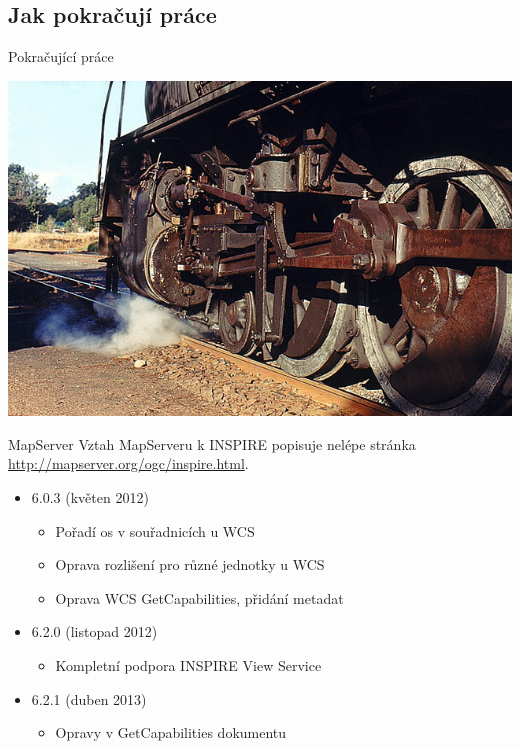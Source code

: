 \documentclass{beamer}
\begin{document}
\subsection{Jak pokračují práce}
\begin{frame}{Pokračující práce}
    \begin{center} 
        \includegraphics[width=\textwidth]{imgs/ils/engine.jpg}
    \end{center}
\end{frame}


\begin{frame}{MapServer}
Vztah MapServeru k INSPIRE popisuje nelépe stránka
\url{http://mapserver.org/ogc/inspire.html}. 

\begin{itemize}
    \item 6.0.3 (květen 2012)
        \begin{itemize}
            \item Pořadí os v souřadnicích u WCS
            \item Oprava rozlišení pro různé jednotky u WCS
            \item Oprava WCS GetCapabilities, přidání metadat
        \end{itemize}
        \pause
    \item 6.2.0 (listopad 2012)
        \begin{itemize}
            \item Kompletní podpora INSPIRE View Service
        \end{itemize}
        \pause
    \item 6.2.1 (duben 2013)
        \begin{itemize}
            \item Opravy v GetCapabilities dokumentu
        \end{itemize}
\end{itemize}
\end{frame}
\end{document}
